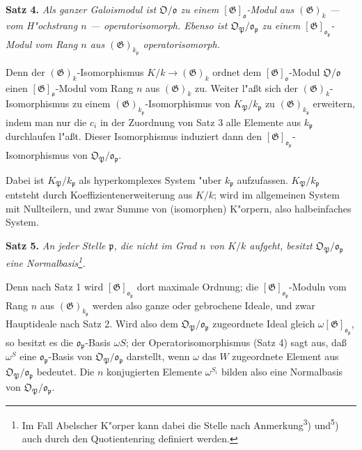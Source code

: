 \documentclass[12pt,a4paper]{article}
\theoremstyle{plain}
\begin{document}
\medskip\noindent\textbf{Satz 4.}
\textit{Als ganzer Galoismodul ist $\mathfrak{O}/\mathfrak{o}$ zu einem $[\mathfrak{G}]_\mathfrak{o}$-Modul aus $(\mathfrak{G})_k$ --- vom H"ochstrang $n$ --- operatorisomorph. Ebenso ist $\mathfrak{O}_\mathfrak{P}/\mathfrak{o}_\mathfrak{p}$ zu einem $[\mathfrak{G}]_{\mathfrak{o}_\mathfrak{p}}$-Modul vom Rang $n$ aus $(\mathfrak{G})_{k_\mathfrak{p}}$ operatorisomorph.}

Denn der $(\mathfrak{G})_k$-Isomorphismus $K/k \to (\mathfrak{G})_k$ ordnet dem $[\mathfrak{G}]_\mathfrak{o}$-Modul $\mathfrak{O}/\mathfrak{o}$ einen $[\mathfrak{G}]_\mathfrak{o}$-Modul vom Rang $n$ aus $(\mathfrak{G})_k$ zu. Weiter l"a\ss t sich der $(\mathfrak{G})_k$-Isomorphismus zu einem $(\mathfrak{G})_{k_\mathfrak{p}}$-Isomorphismus von $K_\mathfrak{P}/k_\mathfrak{p}$ zu $(\mathfrak{G})_{k_\mathfrak{p}}$ erweitern, indem man nur die $c_i$ in der Zuordnung von Satz 3 alle Elemente aus $k_\mathfrak{p}$ durchlaufen l"a\ss t. Dieser Isomorphismus induziert dann den $[\mathfrak{G}]_{\mathfrak{o}_\mathfrak{p}}$-Isomorphismus von $\mathfrak{O}_\mathfrak{P}/\mathfrak{o}_\mathfrak{p}$.

Dabei ist $K_\mathfrak{P}/k_\mathfrak{p}$ als hyperkomplexes System "uber $k_\mathfrak{p}$ aufzufassen. $K_\mathfrak{P}/k_\mathfrak{p}$ entsteht durch Koeffizientenerweiterung aus $K/k$; wird im allgemeinen System mit Nullteilern, und zwar Summe von (isomorphen) K"orpern, also halbeinfaches System.

\medskip\noindent\textbf{Satz 5.}
\textit{An jeder Stelle $\mathfrak{p}$, die nicht im Grad $n$ von $K/k$ aufgeht, besitzt $\mathfrak{O}_\mathfrak{P}/\mathfrak{o}_\mathfrak{p}$ eine Normalbasis\footnote{Im Fall Abelscher K"orper kann dabei die Stelle nach Anmerkung\textsuperscript{3}) und\textsuperscript{5}) auch durch den Quotientenring definiert werden.}.}

Denn nach Satz 1 wird $[\mathfrak{G}]_{\mathfrak{o}_\mathfrak{p}}$ dort maximale Ordnung; die $[\mathfrak{G}]_{\mathfrak{o}_\mathfrak{p}}$-Moduln vom Rang $n$ aus $(\mathfrak{G})_{k_\mathfrak{p}}$ werden also ganze oder gebrochene Ideale, und zwar Hauptideale nach Satz 2. Wird also dem $\mathfrak{O}_\mathfrak{P}/\mathfrak{o}_\mathfrak{p}$ zugeordnete Ideal gleich $\omega [\mathfrak{G}]_{\mathfrak{o}_\mathfrak{p}}$, so besitzt es die $\mathfrak{o}_\mathfrak{p}$-Basis $\omega S$; der Operatorisomorphismus (Satz 4) sagt aus, da\ss $\omega^S$ eine $\mathfrak{o}_\mathfrak{p}$-Basis von $\mathfrak{O}_\mathfrak{P}/\mathfrak{o}_\mathfrak{p}$ darstellt, wenn $\omega$ das $W$ zugeordnete Element aus $\mathfrak{O}_\mathfrak{P}/\mathfrak{o}_\mathfrak{p}$ bedeutet. Die $n$ konjugierten Elemente $\omega^{S_i}$ bilden also eine Normalbasis von $\mathfrak{O}_\mathfrak{P}/\mathfrak{o}_\mathfrak{p}$.
\end{document}
